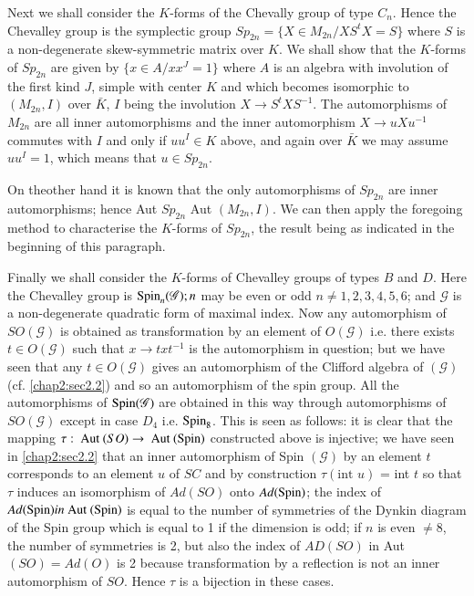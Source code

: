   Next we shall consider the $K$-forms of the Chevally group of
  type $C_n$. Hence the Chevalley group is the symplectic group
  $Sp_{2n} =\bigg\{ X \in M_{2n} \bigg /X S^t X = S \bigg\}$  where
  $S$ is a non-degenerate skew-symmetric matrix over $K$. We shall
  show that the $K$-forms of $Sp_{2n}$ are given by $\bigg\{ x \in A
  \bigg/ xx^J  =1 \bigg\}$  where $A$ is an algebra with involution
  of the first kind $J$, simple with center $K$ and which becomes
  isomorphic to $(M_{2n},I)$ over $\bar{K}$, $I$ being the involution $X
  \longrightarrow S^t X S^{-1}$. The automorphisms of $M_{2n}$
  are all inner automorphisms and the inner automorphism $X
  \longrightarrow u X u^{-1}$ commutes with $I$ and only if $uu^I \in
  K$ above, and again over $\bar{K}$ we may assume $uu^I = 1$, which
  means that $u \in Sp_{2n}$. 
  
  On the\pageoriginale other hand it is known that the only automorphisms of
  $Sp_{2n}$ are inner automorphisms; hence Aut $Sp_{2n}$ Aut $(M_{2n},
  I)$. We can then apply the foregoing method to characterise the
  $K$-forms of $Sp_{2n}$, the result being as indicated in the beginning
  of this paragraph.  
  
  Finally  we shall consider the $K$-forms of Chevalley groups of types
  $B$ and $D$. Here the Chevalley group is $\operatorname{Spin}_n (\mathscr{G}); n$
  may be even or odd $n \neq 1, 2, 3, 4, 5, 6$; and $\mathscr{G}$ is
  a non-degenerate quadratic form of maximal index. Now any
  automorphism of $SO (\mathscr{G})$ is obtained as transformation
  by an element of $O (\mathscr{G})$ i.e. there exists $t \in O
  (\mathscr{G})$ such that $x \to txt^{-1}$ is the automorphism in
  question; but we have seen that any $t \in O (\mathscr{G})$ gives an
  automorphism of the Clifford algebra of $(\mathscr{G})$ (cf. \ref{chap2:sec2.2})
  and so an automorphism of the spin group. All the automorphisms of
  $\operatorname{Spin} (\mathscr{G})$ are obtained in this way through automorphisms
  of $SO (\mathscr{G})$ except in case $D_4$ i.e. $\operatorname{Spin}_8$. This is
  seen as follows: it is clear that the mapping $\tau : \text{ Aut } (SO)
  \to \text{ Aut } (\operatorname{Spin})$ constructed above is injective; we
  have seen in \ref{chap2:sec2.2} that an inner automorphism of Spin
  $(\mathscr{G})$ by an element $t$ corresponds to an element $u$ of
  $SC$ and by construction $\tau(\text{int } u)$ = int $t$ so that $\tau$
  induces an isomorphism of $Ad(SO)$ onto $Ad (\operatorname{Spin})$; the index of $Ad
  (\operatorname{Spin}) in \text{ Aut }(\operatorname{Spin})$ is  equal to the number of
  symmetries of the 
  Dynkin  diagram of the Spin group which is equal to 1 if the
  dimension is odd; if $n$ is even $\neq 8$, the number of symmetries
  is 2, but also the index of $AD (SO)$ in Aut $(SO) = Ad (O)$ is
  2 because transformation by a reflection is not an inner
  automorphism of $SO$. Hence $\tau$ is a bijection in these cases.  
  

